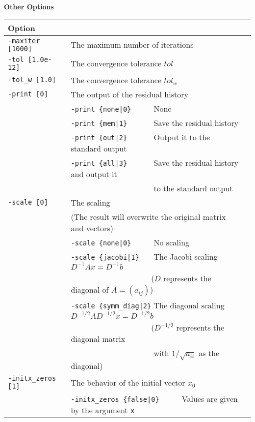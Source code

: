 \documentclass[a4paper]{article}
\begin{document}
\begin{minipage}[t]{\textwidth}
\begin{center}
{\bf Other Options}\\
\begin{tabular}{l|ll}\hline\hline
Option &                          \\ \hline
\verb=-maxiter [1000]= & The maximum number of iterations         \\ 
\verb=-tol [1.0e-12]=  & The convergence tolerance $tol$             \\
\verb=-tol_w [1.0]=    & The convergence tolerance $tol_w$  \\
\verb=-print [0]=      & The output of the residual history                \\
                       & \verb=-print {none|0}     =  None \\
                       & \verb=-print {mem|1}      =  Save the residual history\\
                       & \verb=-print {out|2}      =  Output it to the standard output\\
                       & \verb=-print {all|3}      =  Save the residual history and output it \\
                       & \verb=                    =  to the standard output\\
\verb=-scale [0]=      & The scaling \\
                       & (The result will overwrite the original matrix and vectors) \\
                       & \verb=-scale {none|0}     =  No scaling \\ 
                       & \verb=-scale {jacobi|1}   =  The Jacobi scaling $D^{-1}Ax=D^{-1}b$ \\
                       & \verb=                    =  ($D$ represents the diagonal of $A=(a_{ij})$)\\
                       & \verb=-scale {symm_diag|2}=  The diagonal scaling $D^{-1/2}AD^{-1/2}x=D^{-1/2}b$ \\
                       & \verb=                    =  ($D^{-1/2}$ represents the diagonal matrix \\
                       & \verb=                    =  with $1/\sqrt{a_{ii}}$ as the diagonal) \\ 
\verb=-initx_zeros [1]= & The behavior of the initial vector $x_{0}$  \\
                       & \verb=-initx_zeros {false|0}     =  Values are given by the argument \verb=x= \\

\end{tabular}
\end{center}
\end{minipage}
\end{document}
